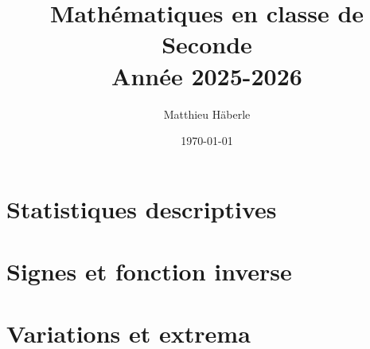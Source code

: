 \documentclass[a4paper, 12pt]{report}
\title{\Huge{Mathématiques en classe de Seconde}\\ Année 2025-2026}
\author{\huge{Matthieu Häberle}}
\date{\today}
\begin{document}
\maketitle
\newpage%
\tableofcontents
\pagebreak















\chapter{Statistiques descriptives}





\chapter{Signes et fonction inverse}



\chapter{Variations et extrema}


\end{document}
